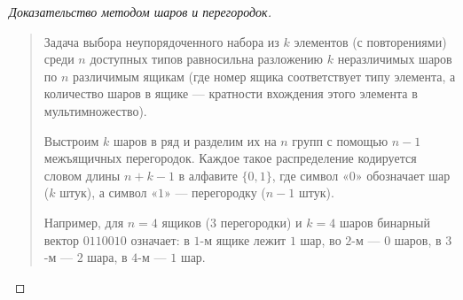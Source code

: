 \begin{proof}[Доказательство методом шаров и перегородок]~\\
    \begin{quote}
        Задача выбора неупорядоченного набора из $k$ элементов (с 
        повторениями) среди $n$ доступных типов равносильна разложению $k$ 
        неразличимых шаров по $n$ различимым ящикам (где номер ящика 
        соответствует типу элемента, а количество шаров в ящике --- 
        кратности вхождения этого элемента в мультимножество).

        Выстроим $k$ шаров в ряд и разделим их на $n$ групп с помощью 
        $n - 1$ межъящичных перегородок. Каждое такое распределение 
        кодируется словом длины $n + k - 1$ в алфавите $\{0, 1\}$, где 
        символ «$0$» обозначает шар ($k$ штук), а символ «$1$» --- 
        перегородку ($n - 1$ штук).

        Например, для $n = 4$ ящиков ($3$ перегородки) и $k = 4$ шаров 
        бинарный вектор $0110010$ означает: в $1$-м ящике лежит $1$ шар, 
        во $2$-м --- $0$ шаров, в $3$-м --- $2$ шара, в $4$-м --- $1$ шар.

        \begin{figure}[H]
            \centering
\end{figure}
\end{quote}
\end{proof}
